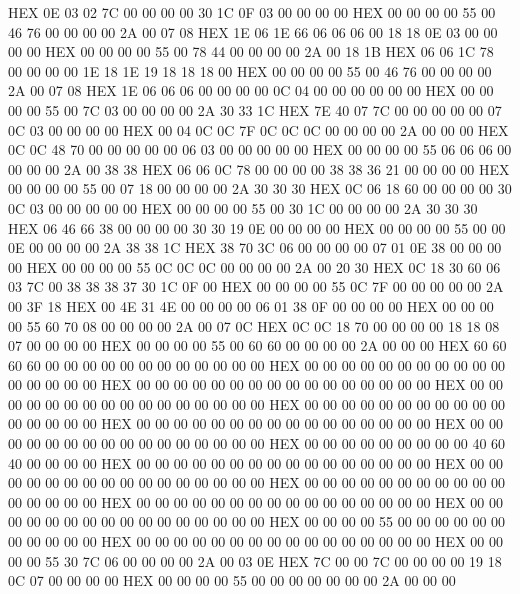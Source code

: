 \documentclass[10pt]{report}
\begin{document}
    HEX     0E 03 02 7C 00 00 00 00 30 1C 0F 03 00 00 00 00
    HEX     00 00 00 00 55 00 46 76 00 00 00 00 2A 00 07 08
    HEX     1E 06 1E 66 06 06 06 00 18 18 0E 03 00 00 00 00
    HEX     00 00 00 00 55 00 78 44 00 00 00 00 2A 00 18 1B
    HEX     06 06 1C 78 00 00 00 00 1E 18 1E 19 18 18 18 00
    HEX     00 00 00 00 55 00 46 76 00 00 00 00 2A 00 07 08
    HEX     1E 06 06 06 00 00 00 00 0C 04 00 00 00 00 00 00
    HEX     00 00 00 00 55 00 7C 03 00 00 00 00 2A 30 33 1C
    HEX     7E 40 07 7C 00 00 00 00 00 07 0C 03 00 00 00 00
    HEX     00 04 0C 0C 7F 0C 0C 0C 00 00 00 00 2A 00 00 00
    HEX     0C 0C 48 70 00 00 00 00 00 06 03 00 00 00 00 00
    HEX     00 00 00 00 55 06 06 06 00 00 00 00 2A 00 38 38
    HEX     06 06 0C 78 00 00 00 00 38 38 36 21 00 00 00 00
    HEX     00 00 00 00 55 00 07 18 00 00 00 00 2A 30 30 30
    HEX     0C 06 18 60 00 00 00 00 30 0C 03 00 00 00 00 00
    HEX     00 00 00 00 55 00 30 1C 00 00 00 00 2A 30 30 30
    HEX     06 46 66 38 00 00 00 00 30 30 19 0E 00 00 00 00
    HEX     00 00 00 00 55 00 00 0E 00 00 00 00 2A 38 38 1C
    HEX     38 70 3C 06 00 00 00 00 07 01 0E 38 00 00 00 00
    HEX     00 00 00 00 55 0C 0C 0C 00 00 00 00 2A 00 20 30
    HEX     0C 18 30 60 06 03 7C 00 38 38 38 37 30 1C 0F 00
    HEX     00 00 00 00 55 0C 7F 00 00 00 00 00 2A 00 3F 18
    HEX     00 4E 31 4E 00 00 00 00 06 01 38 0F 00 00 00 00
    HEX     00 00 00 00 55 60 70 08 00 00 00 00 2A 00 07 0C
    HEX     0C 0C 18 70 00 00 00 00 18 18 08 07 00 00 00 00
    HEX     00 00 00 00 55 00 60 60 00 00 00 00 2A 00 00 00
    HEX     60 60 60 60 00 00 00 00 00 00 00 00 00 00 00 00
    HEX     00 00 00 00 00 00 00 00 00 00 00 00 00 00 00 00
    HEX     00 00 00 00 00 00 00 00 00 00 00 00 00 00 00 00
    HEX     00 00 00 00 00 00 00 00 00 00 00 00 00 00 00 00
    HEX     00 00 00 00 00 00 00 00 00 00 00 00 00 00 00 00
    HEX     00 00 00 00 00 00 00 00 00 00 00 00 00 00 00 00
    HEX     00 00 00 00 00 00 00 00 00 00 00 00 00 00 00 00
    HEX     00 00 00 00 00 00 00 00 00 40 60 40 00 00 00 00
    HEX     00 00 00 00 00 00 00 00 00 00 00 00 00 00 00 00
    HEX     00 00 00 00 00 00 00 00 00 00 00 00 00 00 00 00
    HEX     00 00 00 00 00 00 00 00 00 00 00 00 00 00 00 00
    HEX     00 00 00 00 00 00 00 00 00 00 00 00 00 00 00 00
    HEX     00 00 00 00 00 00 00 00 00 00 00 00 00 00 00 00
    HEX     00 00 00 00 55 00 00 00 00 00 00 00 00 00 00 00
    HEX     00 00 00 00 00 00 00 00 00 00 00 00 00 00 00 00
    HEX     00 00 00 00 55 30 7C 06 00 00 00 00 2A 00 03 0E
    HEX     7C 00 00 7C 00 00 00 00 19 18 0C 07 00 00 00 00
    HEX     00 00 00 00 55 00 00 00 00 00 00 00 2A 00 00 00
\end{document}
